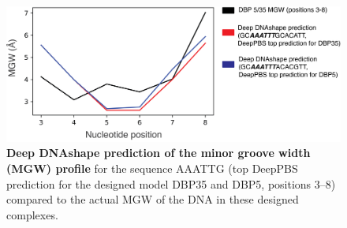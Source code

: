 \begin{center}
\begin{figure}[H]
  \includegraphics[width=\linewidth]{./pdnafigs/figS12.png}
    \caption[Deep DNAshape prediction of the minor groove width (MGW) profile]{\textbf{Deep DNAshape \citep{Li2023} prediction of the minor groove width (MGW) profile} for the sequence AAATTG (top DeepPBS
prediction for the designed model DBP35 and DBP5, positions 3–8) compared to the actual MGW of the DNA in
these designed complexes.}
  \label{fig:pdnaS12}
\end{figure}
\end{center}
